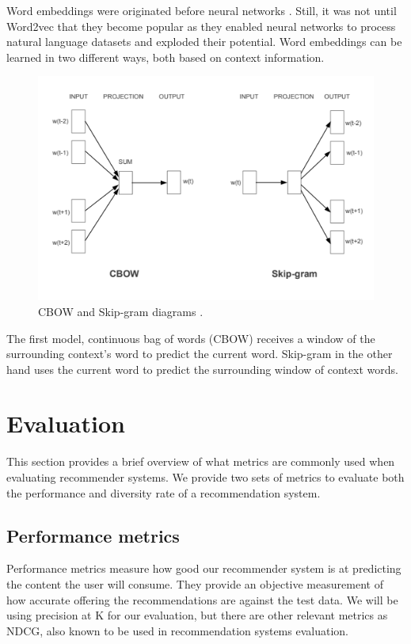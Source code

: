 \documentclass{tex_files/kththesis}
\begin{document}
Word embeddings were originated before neural networks \cite{embeddingsPre1, embeddingsPre2, embeddingsPre3}. Still, it was not until Word2vec \cite{word2vec} that they become popular as they enabled neural networks to process natural language datasets and exploded their potential. Word embeddings can be learned in two different ways, both based on context information.

\begin{figure}[H]
    \centering
    \includegraphics[scale=0.6]{images/background/word2vec.PNG}
    \caption{CBOW and Skip-gram diagrams \cite{word2vec}.}
\end{figure}

The first model, continuous bag of words (CBOW) receives a window of the surrounding context's word to predict the current word. Skip-gram in the other hand uses the current word to predict the surrounding window of context words.


\section{Evaluation}
This section provides a brief overview of what metrics are commonly used when evaluating recommender systems. We provide two sets of metrics to evaluate both the performance and diversity rate of a recommendation system.
\subsection{Performance metrics}
Performance metrics measure how good our recommender system is at predicting the content the user will consume. They provide an objective measurement of how accurate offering the recommendations are against the test data. We will be using precision at K for our evaluation, but there are other relevant metrics as NDCG, also known to be used in recommendation systems evaluation.
\end{document}
